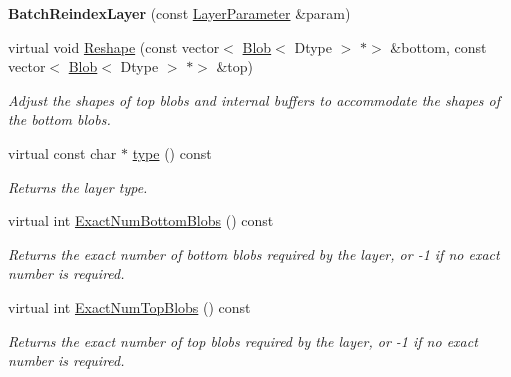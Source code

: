 \begin{DoxyCompactItemize}
\mbox{\label{classcaffe_1_1_batch_reindex_layer_a5585d02e701ad89b5ef46ec9340af7b6}} 
{\bfseries Batch\+Reindex\+Layer} (const \mbox{\hyperlink{classcaffe_1_1_layer_parameter}{Layer\+Parameter}} \&param)
\item 
virtual void \mbox{\hyperlink{classcaffe_1_1_batch_reindex_layer_a7fac1505092f43372ed39a99a1405d4b}{Reshape}} (const vector$<$ \mbox{\hyperlink{classcaffe_1_1_blob}{Blob}}$<$ Dtype $>$ $\ast$$>$ \&bottom, const vector$<$ \mbox{\hyperlink{classcaffe_1_1_blob}{Blob}}$<$ Dtype $>$ $\ast$$>$ \&top)
\begin{DoxyCompactList}\small\item\em Adjust the shapes of top blobs and internal buffers to accommodate the shapes of the bottom blobs. \end{DoxyCompactList}\item 
\mbox{\label{classcaffe_1_1_batch_reindex_layer_ab2a8d8b1a7953ca031d7638f1223b6c7}} 
virtual const char $\ast$ \mbox{\hyperlink{classcaffe_1_1_batch_reindex_layer_ab2a8d8b1a7953ca031d7638f1223b6c7}{type}} () const
\begin{DoxyCompactList}\small\item\em Returns the layer type. \end{DoxyCompactList}\item 
virtual int \mbox{\hyperlink{classcaffe_1_1_batch_reindex_layer_a4120d2fd610655c7ad3d846637564bc6}{Exact\+Num\+Bottom\+Blobs}} () const
\begin{DoxyCompactList}\small\item\em Returns the exact number of bottom blobs required by the layer, or -\/1 if no exact number is required. \end{DoxyCompactList}\item 
virtual int \mbox{\hyperlink{classcaffe_1_1_batch_reindex_layer_a7d5c537334359c2a83cce489fb534342}{Exact\+Num\+Top\+Blobs}} () const
\begin{DoxyCompactList}\small\item\em Returns the exact number of top blobs required by the layer, or -\/1 if no exact number is required. \end{DoxyCompactList}\end{DoxyCompactItemize}
